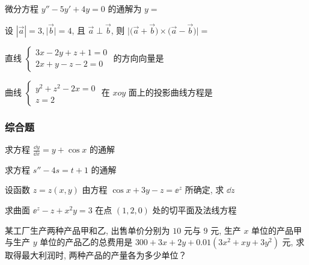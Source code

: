 \begin{ti}
	微分方程 $y'' - 5y' + 4y = 0$ 的通解为 $y = $ \hua
\end{ti}

\begin{ti}
	设 $|\vec{a}| = 3, \bigl| \vec{b} \bigr| = 4$, 且 $\vec{a} \perp \vec{b}$, 则 $\bigl| \bigl( \vec{a} + \vec{b} \bigr) \times \bigl( \vec{a} - \vec{b} \bigr) \bigr| = $ \hua
\end{ti}

\begin{ti}
	直线 $\begin{cases}
		3x - 2y + z + 1 = 0 \\
		2x + y - z - 2 = 0
	\end{cases}$ 的方向向量是 \hua
\end{ti}

\begin{ti}
	曲线 $\begin{cases}
		y^{2} + z^{2} - 2x = 0 \\
		z = 2
	\end{cases}$ 在 $xoy$ 面上的投影曲线方程是 \hua
\end{ti}

\subsubsection{综合题}
\begin{ti}[6 分]
	求方程 $\frac{\dd{y}}{\dd{x}} = y + \cos x$ 的通解
\end{ti}

\begin{ti}[10 分]
	求方程 $s'' - 4s = t + 1$ 的通解
\end{ti}

\begin{ti}[10 分]
	设函数 $z = z(x,y)$ 由方程 $\cos x + 3y - z = \ee^{z}$ 所确定, 求 $\dd{z}$
\end{ti}

\begin{ti}[10 分]
	求曲面 $\ee^{z} - z + x^{2}y = 3$ 在点 $(1,2,0)$ 处的切平面及法线方程
\end{ti}

\begin{ti}[10 分]
	某工厂生产两种产品甲和乙, 出售单价分别为 $10$ 元与 $9$ 元, 生产 $x$ 单位的产品甲与生产 $y$ 单位的产品乙的总费用是 $300 + 3x + 2y + 0.01 (3x^{2} + xy + 3y^{2})$ 元, 求取得最大利润时, 两种产品的产量各为多少单位？
\end{ti}


